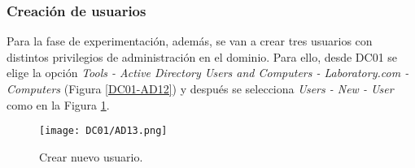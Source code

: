 \subsubsection{Creación de usuarios}

Para la fase de experimentación, además, se van a crear tres usuarios con distintos privilegios de administración en el dominio. Para ello, desde DC01 se elige la opción {\it Tools - Active Directory Users and Computers - Laboratory.com - Computers} (Figura \ref{DC01-AD12}) y después se selecciona {\it Users - New - User} como en la Figura \ref{DC01-AD13}. 

\begin{figure}[H] %
\begin{center}
\texttt{[image: DC01/AD13.png]}
\end{center}
\caption{Crear nuevo usuario.}
\label{DC01-AD13}
\end{figure}

